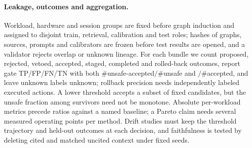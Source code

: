 \paragraph{Leakage, outcomes and aggregation.}
Workload, hardware and session groups are fixed before graph induction and assigned to disjoint train, retrieval, calibration and test roles; hashes of graphs, sources, prompts and calibrators are frozen before test results are opened, and a validator rejects overlap or unknown lineage. For each bundle we count proposed, rejected, vetoed, accepted, staged, completed and rolled-back outcomes, report gate TP/FP/FN/TN with both $\#$unsafe-accepted$/\#$unsafe and $/\#$accepted, and leave unknown labels unknown; rollback precision needs independently labeled executed actions. A lower threshold accepts a subset of fixed candidates, but the unsafe fraction among survivors need not be monotone. Absolute per-workload metrics precede ratios against a named baseline; a Pareto claim needs several measured operating points per method. Drift studies must keep the threshold trajectory and held-out outcomes at each decision, and faithfulness is tested by deleting cited and matched uncited context under fixed seeds.

